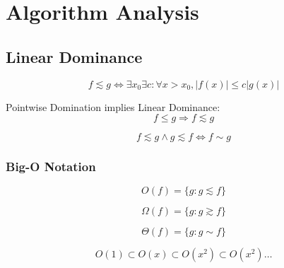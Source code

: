 \section{Algorithm Analysis}\label{sec:algorithm_analysis}

\subsection{Linear Dominance}\label{sec:linear_dominance}

\[
    f \lesssim g \Leftrightarrow
    \exists x_0 \exists c : \forall x > x_0, |f(x)| \leq c |g(x)|
\]

Pointwise Domination implies Linear Dominance:
\[
    f \leq g \Rightarrow f \lesssim g
\]

\[
    f \lesssim g \wedge g \lesssim f \Leftrightarrow f \sim g
\]



\subsubsection{Big-O Notation}\label{sec:bigo_notation}

\[
    O(f) = \{ g : g \lesssim f \}
\]

\[
    \Omega(f) = \{ g : g \gtrsim f \}
\]

\[
    \Theta(f) = \{ g : g \sim f \}
\]

\[
    O(1) \subset O(x) \subset O(x^2) \subset O(x^2) \ldots
\]
